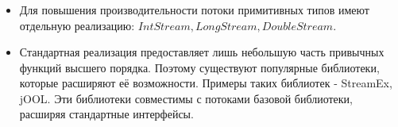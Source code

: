 \begin{frame}
\frametitle{\insertsection} 
\framesubtitle{\insertsubsection}
\begin{itemize}
	\item Для повышения производительности потоки примитивных типов имеют отдельную реализацию: $IntStream, LongStream, DoubleStream$.
	\item Стандартная реализация предоставляет лишь небольшую часть привычных функций высшего порядка. Поэтому существуют популярные библиотеки, которые расширяют её возможности. Примеры таких библиотек - StreamEx, jOOL. Эти библиотеки совместимы с потоками базовой библиотеки, расширяя стандартные интерфейсы.
\end{itemize}
\end{frame}
